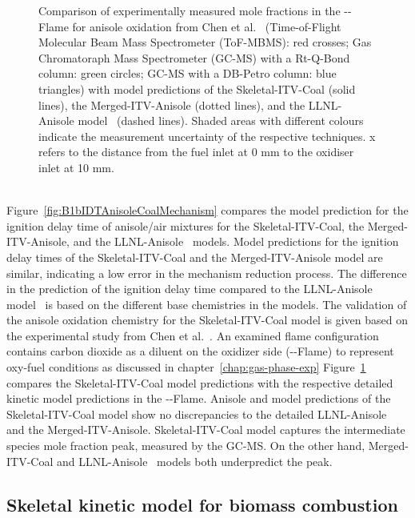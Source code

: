 \begin{refsection}
\begin{figure}[t]
  \hfill
  \caption{Comparison of experimentally measured mole fractions in the --Flame for anisole oxidation from Chen et al.~\cite{Chen2022} (Time-of-Flight Molecular Beam Mass Spectrometer (ToF-MBMS): red crosses; Gas Chromatoraph Mass Spectrometer (GC-MS) with a Rt-Q-Bond column: green circles; GC-MS with a DB-Petro column: blue triangles) with model predictions of the Skeletal-ITV-Coal (solid lines), the Merged-ITV-Anisole (dotted lines), and the LLNL-Anisole model~\cite{Wagnon2018} (dashed lines). Shaded areas with different colours indicate the measurement uncertainty of the respective techniques. x refers to the distance from the fuel inlet at 0 mm to the oxidiser inlet at 10 mm.}
  \label{fig:B1bAnisoleOxidationCoalMechanismCO2O}
\end{figure}
\\
Figure~\ref{fig:B1bIDTAnisoleCoalMechanism} compares the model prediction for the ignition delay time of anisole/air mixtures for the Skeletal-ITV-Coal, the Merged-ITV-Anisole, and the LLNL-Anisole~\cite{Wagnon2018} models. Model predictions for the ignition delay times of the Skeletal-ITV-Coal and the Merged-ITV-Anisole model are similar, indicating a low error in the mechanism reduction process. The difference in the prediction of the ignition delay time compared to the LLNL-Anisole model~\cite{Wagnon2018} is based on the different base chemistries in the models.
The validation of the anisole oxidation chemistry for the Skeletal-ITV-Coal model is given based on the experimental study from Chen et al.~\cite{Chen2022}. An examined flame configuration contains carbon dioxide as a diluent on the oxidizer side (--Flame) to represent oxy-fuel conditions as discussed in chapter~\ref{chap:gas-phase-exp} Figure~\ref{fig:B1bAnisoleOxidationCoalMechanismCO2O} compares the Skeletal-ITV-Coal model predictions with the respective detailed kinetic model predictions in the --Flame. Anisole and  model predictions of the Skeletal-ITV-Coal model show no discrepancies to the detailed LLNL-Anisole~\cite{Wagnon2018} and the Merged-ITV-Anisole. Skeletal-ITV-Coal model captures the intermediate  species mole fraction peak, measured by the GC-MS. On the other hand, Merged-ITV-Coal and LLNL-Anisole~\cite{Wagnon2018} models both underpredict the  peak.


\subsection{Skeletal kinetic model for biomass combustion}


\end{refsection}
